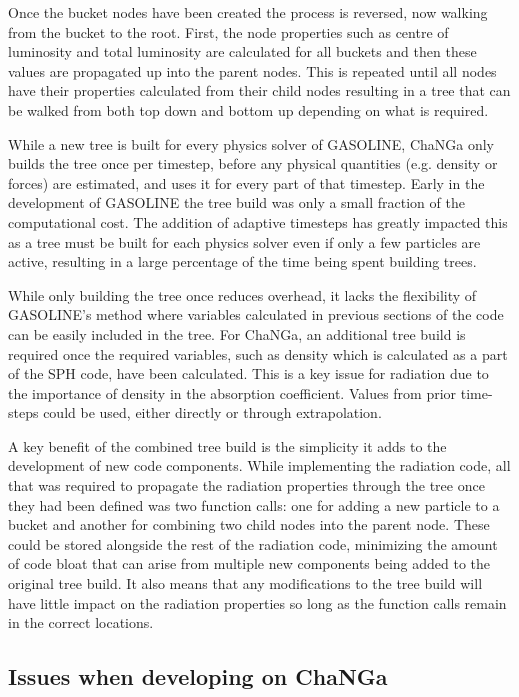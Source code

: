 Once the bucket nodes have been created the process is reversed, now walking from the bucket to the root. First, the node properties such as centre of luminosity and total luminosity are calculated for all buckets and then these values are propagated up into the parent nodes. This is repeated until all nodes have their properties calculated from their child nodes resulting in a tree that can be walked from both top down and bottom up depending on what is required.

While a new tree is built for every physics solver of GASOLINE, ChaNGa only builds the tree once per timestep, before any physical quantities (e.g. density or forces) are estimated, and uses it for every part of that timestep. Early in the development of GASOLINE the tree build was only a small fraction of the computational cost. The addition of adaptive timesteps has greatly impacted this as a tree must be built for each physics solver even if only a few particles are active, resulting in a large percentage of the time being spent building trees. 

While only building the tree once reduces overhead, it lacks the flexibility of GASOLINE's method where variables calculated in previous sections of the code can be easily included in the tree. For ChaNGa, an additional tree build is required once the required variables, such as density which is calculated as a part of the SPH code, have been calculated. This is a key issue for radiation due to the importance of density in the absorption coefficient. Values from prior time-steps could be used, either directly or through extrapolation.

A key benefit of the combined tree build is the simplicity it adds to the development of new code components. While implementing the radiation code, all that was required to propagate the radiation properties through the tree once they had been defined was two function calls: one for adding a new particle to a bucket and another for combining two child nodes into the parent node. These could be stored alongside the rest of the radiation code, minimizing the amount of code bloat that can arise from multiple new components being added to the original tree build. It also means that any modifications to the tree build will have little impact on the radiation properties so long as the function calls remain in the correct locations.

\subsection{Issues when developing on ChaNGa}


